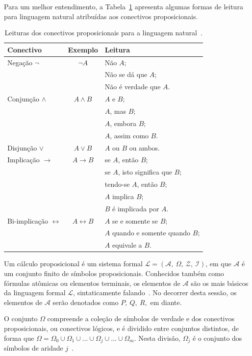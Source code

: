 Para um melhor entendimento, a Tabela~\ref{tab:prop_conec} apresenta algumas formas de leitura para linguagem natural atribuídas aos conectivos proposicionais.

\begin{table}[!ht]
	\centering\tiny{
		\caption{Leituras dos conectivos proposicionais para a linguagem natural~\cite{abe2002introduccao}. \label{tab:prop_conec}}
\begin{tabular}{|l|c|l|}
	\hline 
	\textbf{Conectivo} & \textbf{Exemplo} & \textbf{Leitura} \\ 
	\hline 
	Negação $\neg$ & $\neg A$ & Não $A$; \\ & & Não se dá que $A$; \\ & & Não é verdade que $A$. \\ 
	\hline 
	Conjunção $\wedge$ & $A\wedge B$ & $A$ e $B$; \\ & & $A$, mas $B$; \\ & & $A$, embora $B$; \\ & & $A$, assim como $B$. \\ 
	\hline 
	Disjunção $\vee$ & $A\vee B$ & $A$ ou $B$ ou ambos. \\ 
	\hline 
	Implicação $\rightarrow$ & $A\rightarrow B$ & se $A$, então $B$; \\ & & se $A$, isto significa que $B$; \\ & & tendo-se $A$, então $B$; \\ & & $A$ implica $B$; \\ & & $B$ é implicada por $A$. \\ 
	\hline 
	Bi-implicação $\leftrightarrow$ & $A\leftrightarrow B$ & $A$ se e somente se $B$; \\ & & $A$ quando e somente quando $B$; \\ & & $A$ equivale a $B$. \\ 
	\hline 
\end{tabular}   
	}
\end{table}

Um cálculo proposicional é um sistema formal $\mathcal{L} = (\mathcal{A},~\Omega,~\mathcal{Z},~\mathcal{I})$, em que $\mathcal{A}$ é um conjunto finito de símbolos proposicionais. Conhecidos também como fórmulas atômicas ou elementos terminais, os elementos de $\mathcal{A}$ são os mais básicos da linguagem formal $\mathcal{L}$, sintaticamente falando~\cite{bedregal2002logica}. No decorrer desta sessão, os elementos de $\mathcal{A}$ serão denotados como $P,~Q,~R,$ em diante.

O conjunto $\Omega$ compreende a coleção de símbolos de verdade e dos conectivos proposicionais, ou conectivos lógicos, e é dividido entre conjuntos distintos, de forma que $\Omega = \Omega_{0}\cup \Omega_{1} \cup ... \cup \Omega_{j} \cup ... \cup \Omega_{m}$. Nesta divisão, $\Omega_{j}$ é o conjunto dos símbolos de aridade $j$~\cite{bedregal2002logica}.

